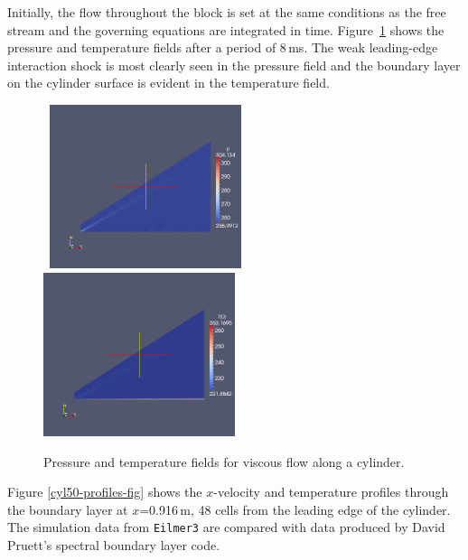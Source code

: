 \medskip
Initially, the flow throughout the block is set at the same conditions
as the free stream and the governing equations are integrated in time.
Figure~\ref{cyl50-flow-field-fig} shows the pressure and temperature fields
after a period of 8\,ms.
The weak leading-edge interaction shock is most clearly seen in the pressure field
and the boundary layer on the cylinder surface is evident in the temperature field.

\begin{figure}[htbp]
\mbox{
\includegraphics[width=0.5\textwidth]{../2D/axi-cylinder/cyl50-t8ms-p.png}
\includegraphics[width=0.5\textwidth]{../2D/axi-cylinder/cyl50-t8ms-T.png}
}
\caption{Pressure and temperature fields for viscous flow along a cylinder.}
   \label{cyl50-flow-field-fig}
\end{figure}

\medskip
Figure \ref{cyl50-profiles-fig} shows the $x$-velocity and temperature profiles
through the boundary layer at $x$=0.916\,m, 
48 cells from the leading edge of the cylinder.
The simulation data from \texttt{Eilmer3} are compared with data produced by David Pruett's
spectral boundary layer code.

